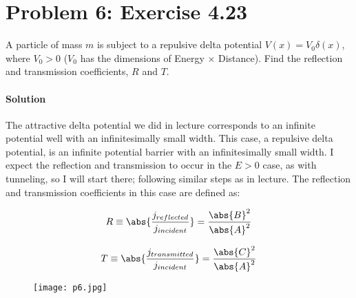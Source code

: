 \documentclass{article}
\begin{document}
\clearpage	
	
	\section*{Problem 6: Exercise 4.23}
	
	A particle of mass $m$ is subject to a repulsive delta potential $V(x) = V_0 \delta(x)$, where $V_0 > 0$ ($V_0$ has the dimensions of Energy $\times$ Distance). Find the reflection and transmission coefficients, $R$ and $T$.
	\paragraph{Solution} The attractive delta potential we did in lecture corresponds to an infinite potential well with an infinitesimally small width. This case, a repulsive delta potential, is an infinite potential barrier with an infinitesimally small width. I expect the reflection and transmission to occur in the $E>0$ case, as with tunneling, so I will start there; following similar steps as in lecture. The reflection and transmission coefficients in this case are defined as:
	
	\begin{minipage}{0.45\textwidth}
		\begin{equation}
			\begin{split}
				R \equiv \abs{\frac{j_{reflected}}{j_{incident}}} = \frac{\abs{B}^2}{\abs{A}^2}
			\end{split}
		\end{equation}
	\end{minipage}
	\begin{minipage}{0.45\textwidth}
		\begin{equation}
			\begin{split}
				T \equiv \abs{\frac{j_{transmitted}}{j_{incident}}} = \frac{\abs{C}^2}{\abs{A}^2}
			\end{split}
		\end{equation}
	\end{minipage}
	
	\begin{figure}[htbp]
		\centering
		\texttt{[image: p6.jpg]}
	\end{figure}
	
\end{document}
